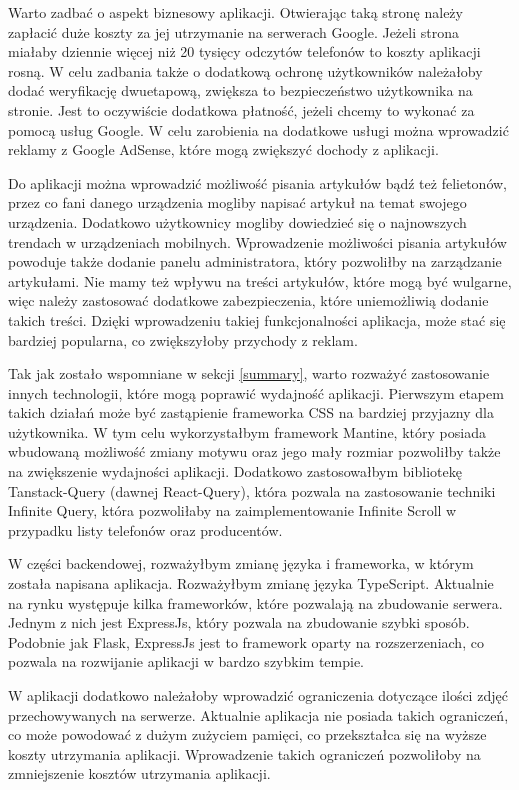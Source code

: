 Warto zadbać o aspekt biznesowy aplikacji. Otwierając taką stronę należy zapłacić duże koszty za jej utrzymanie na serwerach Google. Jeżeli strona miałaby dziennie więcej niż 20 tysięcy odczytów telefonów to koszty aplikacji rosną. W celu zadbania także o dodatkową ochronę użytkowników należałoby dodać weryfikację dwuetapową, zwiększa to bezpieczeństwo użytkownika na stronie. Jest to oczywiście dodatkowa płatność, jeżeli chcemy to wykonać za pomocą usług Google. W celu zarobienia na dodatkowe usługi można wprowadzić reklamy z Google AdSense, które mogą zwiększyć dochody z aplikacji.

Do aplikacji można wprowadzić możliwość pisania artykułów bądź też felietonów, przez co fani danego urządzenia mogliby napisać artykuł na temat swojego urządzenia. Dodatkowo użytkownicy mogliby dowiedzieć się o najnowszych trendach w urządzeniach mobilnych. Wprowadzenie możliwości pisania artykułów powoduje także dodanie panelu administratora, który pozwoliłby na zarządzanie artykułami. Nie mamy też wpływu na treści artykułów, które mogą być wulgarne, więc należy zastosować dodatkowe zabezpieczenia, które uniemożliwią dodanie takich treści. Dzięki wprowadzeniu takiej funkcjonalności aplikacja, może stać się bardziej popularna, co zwiększyłoby przychody z reklam.

Tak jak zostało wspomniane w sekcji \ref{summary}, warto rozważyć zastosowanie innych technologii, które mogą poprawić wydajność aplikacji. Pierwszym etapem takich działań może być zastąpienie frameworka CSS na bardziej przyjazny dla użytkownika. W tym celu wykorzystałbym framework Mantine, który posiada wbudowaną możliwość zmiany motywu oraz jego mały rozmiar pozwoliłby także na zwiększenie wydajności aplikacji. Dodatkowo zastosowałbym bibliotekę Tanstack-Query (dawnej React-Query), która pozwala na zastosowanie techniki Infinite Query, która pozwoliłaby na zaimplementowanie Infinite Scroll w przypadku listy telefonów oraz producentów.

W części backendowej, rozważyłbym zmianę języka i frameworka, w którym została napisana aplikacja. Rozważyłbym zmianę języka TypeScript. Aktualnie na rynku występuje kilka frameworków, które pozwalają na zbudowanie serwera. Jednym z nich jest ExpressJs, który pozwala na zbudowanie szybki sposób. Podobnie jak Flask, ExpressJs jest to framework oparty na rozszerzeniach, co pozwala na rozwijanie aplikacji w bardzo szybkim tempie.

W aplikacji dodatkowo należałoby wprowadzić ograniczenia dotyczące ilości zdjęć przechowywanych na serwerze. Aktualnie aplikacja nie posiada takich ograniczeń, co może powodować z dużym zużyciem pamięci, co przekształca się na wyższe koszty utrzymania aplikacji. Wprowadzenie takich ograniczeń pozwoliłoby na zmniejszenie kosztów utrzymania aplikacji.
